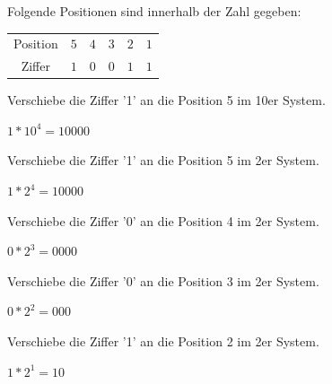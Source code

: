 \begin{exerciseseries}[columns=1,solsubrule=\hrule]{}
    Folgende Positionen sind innerhalb der Zahl gegeben:\\
    \begin{tabular}{ c c c c c c }
        Position & $5$ & $4$ & $3$ & $2$ & $1$ \\
        Ziffer & $1$ & $0$ & $0$ & $1$ & $1$
    \end{tabular}
    \begin{exercise}
        Verschiebe die Ziffer '1' an die Position 5 im 10er System.\\
        \underline{\hspace{12cm}}
    \end{exercise}
    \begin{solution}
        $1 * 10^4 = 10000$
    \end{solution}

    \begin{exercise}
        Verschiebe die Ziffer '1' an die Position 5 im 2er System.\\
        \underline{\hspace{12cm}}
    \end{exercise}
    \begin{solution}
        $1 * 2^4 = 10000$
    \end{solution}

    \begin{exercise}
        Verschiebe die Ziffer '0' an die Position 4 im 2er System.\\
        \underline{\hspace{12cm}}
    \end{exercise}
    \begin{solution}
        $0 * 2^3 = 0000$
    \end{solution}

    \begin{exercise}
        Verschiebe die Ziffer '0' an die Position 3 im 2er System.\\
        \underline{\hspace{12cm}}
    \end{exercise}
    \begin{solution}
        $0 * 2^2 = 000$
    \end{solution}

    \begin{exercise}
        Verschiebe die Ziffer '1' an die Position 2 im 2er System.\\
        \underline{\hspace{12cm}}
    \end{exercise}
    \begin{solution}
        $1 * 2^1 = 10$
    \end{solution}


\end{exerciseseries}
